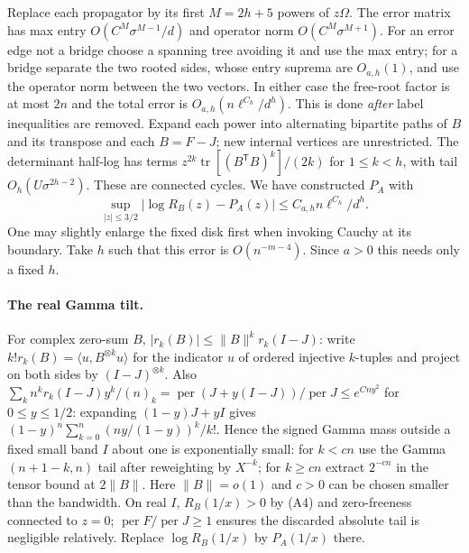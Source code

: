Replace each propagator by its first $M=2h+5$ powers of $z\Omega$. The error matrix has max entry $O(C^M\sigma^{M-1}/d)$ and operator norm $O(C^M\sigma^{M+1})$. For an error edge not a bridge choose a spanning tree avoiding it and use the max entry; for a bridge separate the two rooted sides, whose entry suprema are $O_{a,h}(1)$, and use the operator norm between the two vectors. In either case the free-root factor is at most $2n$ and the total error is $O_{a,h}(n\ell^{C_h}/d^h)$. This is done \emph{after} label inequalities are removed. Expand each power into alternating bipartite paths of $B$ and its transpose and each $B=F-J$; new internal vertices are unrestricted. The determinant half-log has terms $z^{2k}\operatorname{tr}[(B^{\mathsf T}B)^k]/(2k)$ for $1\le k<h$, with tail $O_h(U\sigma^{2h-2})$. These are connected cycles. We have constructed $P_A$ with
\[
 \sup_{|z|\le3/2}|\log R_B(z)-P_A(z)|\le C_{a,h} n\ell^{C_h}/d^h .
 \tag{A6}
\]
One may slightly enlarge the fixed disk first when invoking Cauchy at its boundary. Take $h$ such that this error is $O(n^{-m-4})$. Since $a>0$ this needs only a fixed $h$.

\paragraph{The real Gamma tilt.}
For complex zero-sum $B$, $|r_k(B)|\le\|B\|^k r_k(I-J)$: write $k!r_k(B)=\langle u,B^{\otimes k}u\rangle$ for the indicator $u$ of ordered injective $k$-tuples and project on both sides by $(I-J)^{\otimes k}$. Also $\sum_k n^k r_k(I-J)y^k/(n)_k=\operatorname{per}(J+y(I-J))/\operatorname{per}J\le e^{Cny^2}$ for $0\le y\le1/2$: expanding $(1-y)J+yI$ gives $(1-y)^n\sum_{k=0}^n(ny/(1-y))^k/k!$. Hence the signed Gamma mass outside a fixed small band $I$ about one is exponentially small: for $k<cn$ use the Gamma$(n+1-k,n)$ tail after reweighting by $X^{-k}$; for $k\ge cn$ extract $2^{-cn}$ in the tensor bound at $2\|B\|$. Here $\|B\|=o(1)$ and $c>0$ can be chosen smaller than the bandwidth. On real $I$, $R_B(1/x)>0$ by (A4) and zero-freeness connected to $z=0$; $\operatorname{per}F/\operatorname{per}J\ge1$ ensures the discarded absolute tail is negligible relatively. Replace $\log R_B(1/x)$ by $P_A(1/x)$ there.

